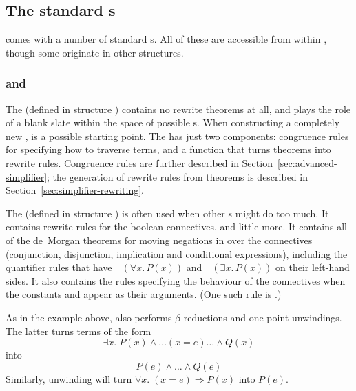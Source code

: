 \subsection{The standard \simpset{}s}
\label{sec:standard-simpsets}

\HOL{} comes with a number of standard \simpset{}s.  All of these are
accessible from within , though some originate in other
structures.

\subsubsection{ and }
\label{sec:purebool-ss}
%
%
The  \simpset{} (defined in structure )
contains no rewrite theorems at all, and plays the role of a blank
slate within the space of possible \simpset{}s.  When constructing a
completely new \simpset,  is a possible starting point.
The  \simpset{} has just two components: congruence rules
for specifying how to traverse terms, and a function that turns
theorems into rewrite rules.  Congruence rules are further described
in Section~\ref{sec:advanced-simplifier}; the generation of rewrite
rules from theorems is described in
Section~\ref{sec:simplifier-rewriting}.

%
The  \simpset{} (defined in structure ) is
often used when other \simpset{}s might do too much.  It contains
rewrite rules for the boolean connectives, and little more.  It
contains all of the de~Morgan theorems for moving negations in over
the connectives (conjunction, disjunction, implication and conditional
expressions), including the quantifier rules that have $\neg(\forall
x.\,P(x))$ and $\neg(\exists x.\,P (x))$ on their left-hand sides.  It
also contains the rules specifying the behaviour of the connectives
when the constants  and  appear as their
arguments.  (One such rule is .)

As in the example above,  also performs
$\beta$-reductions and one-point unwindings.  The latter turns terms
of the form \[
\exists x.\;P(x)\land\dots (x = e) \dots\land Q(x)
\]
into
\[
P(e) \land \dots \land Q(e)
\]
Similarly, unwinding will turn $\forall x.\;(x = e)
\Rightarrow P(x)$ into $P(e)$.

